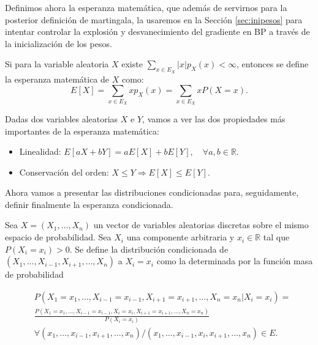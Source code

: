 Definimos ahora la esperanza matemática, que además de servirnos para la posterior definición de martingala, la usaremos en la Sección \ref{sec:inipesos} para intentar controlar la explosión y desvanecimiento del gradiente en BP a través de la inicialización de los pesos.

\begin{definicion}
	Si para la variable aleatoria $X$ existe $\sum_{x \in E_X} |x| p_X(x) < \infty$, entonces se define la esperanza matemática de $X$ como:
	\begin{equation*}
		E[X]= \sum_{x \in E_X} x p_X(x) = \sum_{x \in E_X} x P(X=x).
	\end{equation*}
\end{definicion}

Dadas dos variables aleatorias $X$ e $Y$, vamos a ver las dos propiedades más importantes de la esperanza matemática:

\begin{itemize}
	\item Linealidad: $E[aX+bY]=aE[X]+bE[Y], \quad \forall a,b \in \mathbb{R}$.

	\item Conservación del orden: $ X \leq Y \Rightarrow E[X] \leq E[Y]$.

\end{itemize}

Ahora vamos a presentar las distribuciones condicionadas para, seguidamente, definir finalmente la esperanza condicionada.

\begin{definicion}
	Sea $X=(X_1, \ldots, X_n)$ un vector de variables aleatorias discretas sobre el mismo espacio de probabilidad. Sea $X_i$ una componente arbitraria y $x_i \in \mathbb{R}$ tal que $P(X_i=x_i)>0$. Se define la distribución condicionada de $(X_1, \ldots, X_{i-1}, X_{i+1}, \ldots, X_n)$ a $X_i=x_i$ como la determinada por la función masa de probabilidad

\begin{align*}
	&P(X_1=x_1, \ldots, X_{i-1}=x_{i-1}, X_{i+1}=x_{i+1}, \ldots, X_n=x_n | X_i=x_i)= \\
	&\frac{P(X_1=x_1, \ldots, X_{i-1}=x_{i-1}, X_i=x_i,  X_{i+1}=x_{i+1}, \ldots, X_n=x_n )}{P(X_i=x_i)} \\
	& \forall (x_1, \ldots, x_{i-1}, x_{i+1}, \ldots, x_n) / (x_1, \ldots, x_{i-1}, x_i, x_{i+1}, \ldots, x_n) \in E.
\end{align*}
\end{definicion}

